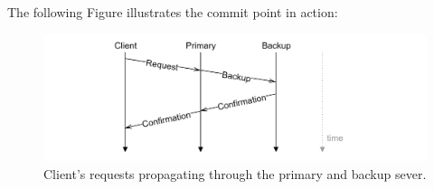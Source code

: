 \newpage 

\noindent
The following Figure illustrates the commit point in action:
\begin{figure}[h]
    \centering
    \includegraphics[width=1\textwidth]{Sections/rep/commit.png}
    \caption{Client's requests propagating through the primary and backup sever.}
\end{figure}
